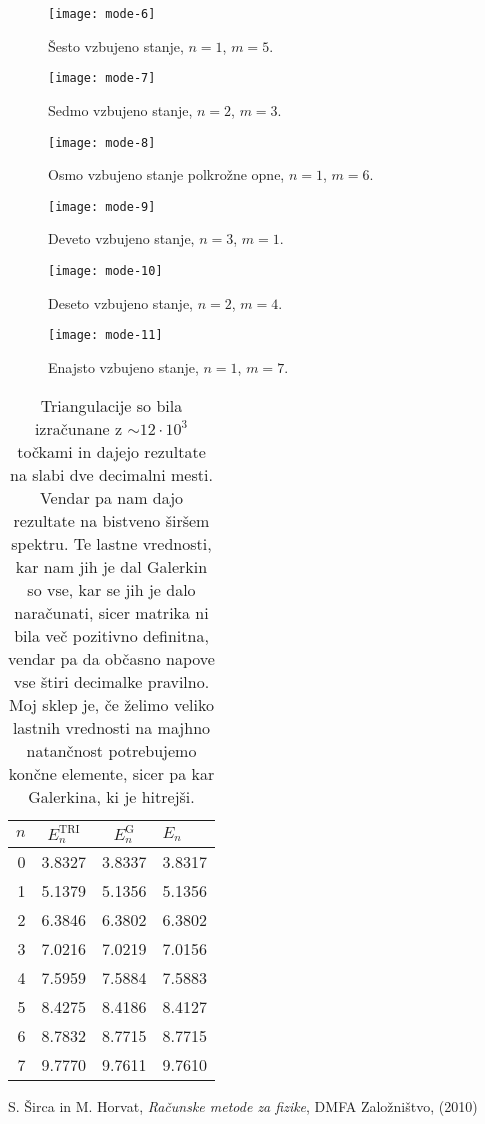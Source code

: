 \documentclass[a4 paper, 12pt]{article}
\begin{document}
\begin{figure}[H]\centering
	\texttt{[image: mode-6]}
	\caption{\v Sesto vzbujeno stanje, $n = 1$, $m = 5$.}
	\label{gr7}
\end{figure}

\begin{figure}[H]\centering
	\texttt{[image: mode-7]}
	\caption{Sedmo vzbujeno stanje, $n = 2$, $m = 3$.}
	\label{gr8}
\end{figure}

\begin{figure}[H]\centering
	\texttt{[image: mode-8]}
	\caption{Osmo vzbujeno stanje polkro\v zne opne, $n = 1$, $m = 6$.}
	\label{gr9}
\end{figure}

\begin{figure}[H]\centering
	\texttt{[image: mode-9]}
	\caption{Deveto vzbujeno stanje, $n = 3$, $m = 1$.}
	\label{gr10}
\end{figure}

\begin{figure}[H]\centering
	\texttt{[image: mode-10]}
	\caption{Deseto vzbujeno stanje, $n = 2$, $m = 4$.}
	\label{gr11}
\end{figure}

\begin{figure}[H]\centering
	\texttt{[image: mode-11]}
	\caption{Enajsto vzbujeno stanje, $n = 1$, $m = 7$.}
	\label{gr12}
\end{figure}


\begin{table}[H]\centering
	\caption{Triangulacije so bila izra\v cunane z $\sim 12 \cdot 10^3$ to\v ckami in dajejo rezultate
		na slabi dve decimalni mesti. Vendar pa nam dajo rezultate na bistveno \v sir\v sem spektru.
		Te lastne vrednosti, kar nam jih je dal Galerkin so vse, kar se jih je dalo nara\v cunati,
		sicer matrika ni bila ve\v c pozitivno definitna, vendar pa da ob\v casno napove vse \v stiri
		decimalke pravilno. Moj sklep je, \v ce \v zelimo veliko lastnih vrednosti na majhno natan\v cnost
		potrebujemo kon\v cne elemente, sicer pa kar Galerkina, ki je hitrej\v si.}
	\begin{tabular}{r|c|c|l}
		$n$ & $E_n^\text{TRI}$ & $E_n^\text{G}$ & $E_n$ \\
		\hline
		0 &	3.8327  & 3.8337 & 3.8317 \\
		1 &	5.1379  & 5.1356 & 5.1356 \\
		2 &	6.3846  & 6.3802 & 6.3802 \\
		3 &	7.0216  & 7.0219 & 7.0156 \\
		4 &	7.5959  & 7.5884 & 7.5883 \\
		5 &	8.4275  & 8.4186 & 8.4127 \\
		6 &	8.7832  & 8.7715 & 8.7715 \\
		7 &	9.7770  & 9.7611 & 9.7610 \\
	\end{tabular}
	\label{tab1}
\end{table}

\begin{thebibliography}{9}
		S. \v Sirca in M. Horvat,
		{\em Ra\v cunske metode za fizike},
		DMFA Zalo\v zni\v stvo,
		(2010)
\end{thebibliography}
\end{document}
